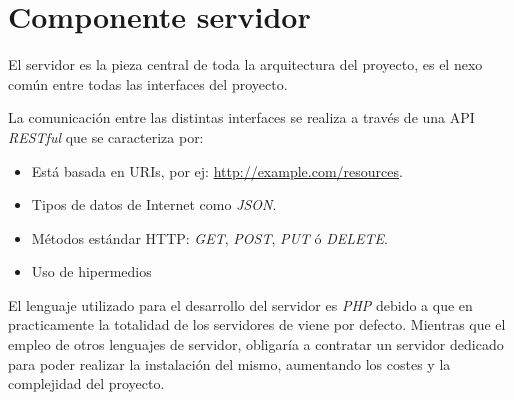\section{Componente servidor}

El servidor es la pieza central de toda la arquitectura del proyecto, es el nexo común entre todas las interfaces del proyecto.

La comunicación entre las distintas interfaces se realiza a través de una API \emph{RESTful} que se caracteriza por:

\begin{itemize}
    \item Está basada en URIs, por ej: \url{http://example.com/resources}.
    \item Tipos de datos de Internet como \emph{JSON}.
    \item Métodos estándar HTTP: \emph{GET}, \emph{POST}, \emph{PUT} ó \emph{DELETE}.
    \item Uso de hipermedios
\end{itemize}

El lenguaje utilizado para el desarrollo del servidor es \emph{PHP} debido a que en practicamente la totalidad de los servidores de viene por defecto. Mientras que el empleo de otros lenguajes de servidor, obligaría a contratar un servidor dedicado para poder realizar la instalación del mismo, aumentando los costes y la complejidad del proyecto.